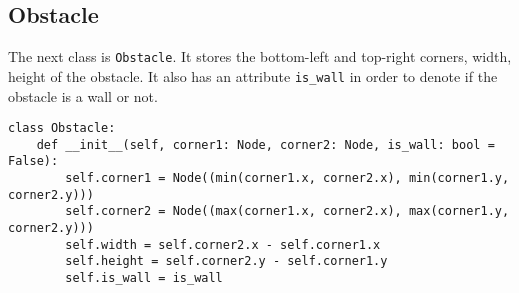 \documentclass[12pt]{report}
\begin{document}
\subsection{Obstacle}

The next class is \texttt{Obstacle}. It stores the bottom-left and top-right corners, width, height of the obstacle. It also has an attribute \texttt{is\_wall} in order to denote if the obstacle is a wall or not.

\begin{lstlisting}[caption={Obstacle Class}]
class Obstacle:
    def __init__(self, corner1: Node, corner2: Node, is_wall: bool = False):
        self.corner1 = Node((min(corner1.x, corner2.x), min(corner1.y, corner2.y)))
        self.corner2 = Node((max(corner1.x, corner2.x), max(corner1.y, corner2.y)))
        self.width = self.corner2.x - self.corner1.x
        self.height = self.corner2.y - self.corner1.y
        self.is_wall = is_wall
\end{lstlisting}
\end{document}

